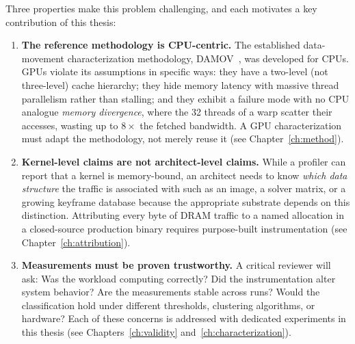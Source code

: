 Three properties make this problem challenging, and each motivates a key contribution of this thesis:

\begin{enumerate}
\item \textbf{The reference methodology is CPU-centric.} The established data-movement characterization methodology, DAMOV~\cite{oliveira2021damov}, was developed for CPUs. GPUs violate its assumptions in specific ways: they have a two-level (not three-level) cache hierarchy; they hide memory latency with massive thread parallelism rather than stalling; and they exhibit a failure mode with no CPU analogue \emph{memory divergence}, where the 32 threads of a warp scatter their accesses, wasting up to $8\times$ the fetched bandwidth. A GPU characterization must adapt the methodology, not merely reuse it (see Chapter~\ref{ch:method}).
\item \textbf{Kernel-level claims are not architect-level claims.} While a profiler can report that a kernel is memory-bound, an architect needs to know \emph{which data structure} the traffic is associated with such as an image, a solver matrix, or a growing keyframe database because the appropriate substrate depends on this distinction. Attributing every byte of DRAM traffic to a named allocation in a closed-source production binary requires purpose-built instrumentation (see Chapter~\ref{ch:attribution}).
\item \textbf{Measurements must be proven trustworthy.} A critical reviewer will ask: Was the workload computing correctly? Did the instrumentation alter system behavior? Are the measurements stable across runs? Would the classification hold under different thresholds, clustering algorithms, or hardware? Each of these concerns is addressed with dedicated experiments in this thesis (see Chapters~\ref{ch:validity} and~\ref{ch:characterization}).\end{enumerate}

